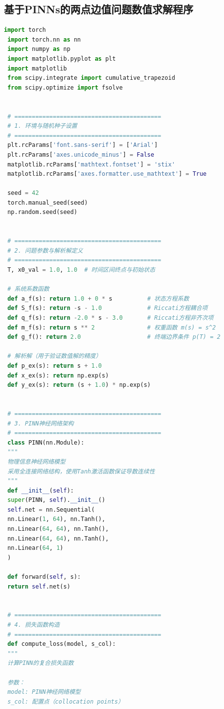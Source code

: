 \documentclass{GZUbachelorthesis}
\begin{document}
 \subsection*{基于PINNs的两点边值问题数值求解程序}
 \begin{lstlisting}[language=python]
 import torch
 import torch.nn as nn
 import numpy as np
 import matplotlib.pyplot as plt
 import matplotlib
 from scipy.integrate import cumulative_trapezoid
 from scipy.optimize import fsolve
 
 
 # ==========================================
 # 1. 环境与随机种子设置
 # ==========================================
 plt.rcParams['font.sans-serif'] = ['Arial']
 plt.rcParams['axes.unicode_minus'] = False
 matplotlib.rcParams['mathtext.fontset'] = 'stix'
 matplotlib.rcParams['axes.formatter.use_mathtext'] = True
 
 seed = 42
 torch.manual_seed(seed)
 np.random.seed(seed)
 
 
 # ==========================================
 # 2. 问题参数与解析解定义
 # ==========================================
 T, x0_val = 1.0, 1.0  # 时间区间终点与初始状态
 
 # 系统系数函数
 def a_f(s): return 1.0 + 0 * s          # 状态方程系数
 def S_f(s): return -s - 1.0             # Riccati方程耦合项
 def q_f(s): return -2.0 * s - 3.0       # Riccati方程非齐次项
 def m_f(s): return s ** 2               # 权重函数 m(s) = s^2
 def g_f(): return 2.0                   # 终端边界条件 p(T) = 2
 
 # 解析解（用于验证数值解的精度）
 def p_ex(s): return s + 1.0
 def x_ex(s): return np.exp(s)
 def y_ex(s): return (s + 1.0) * np.exp(s)
 
 
 # ==========================================
 # 3. PINN神经网络架构
 # ==========================================
 class PINN(nn.Module):
 """
 物理信息神经网络模型
 采用全连接网络结构，使用Tanh激活函数保证导数连续性
 """
 def __init__(self):
 super(PINN, self).__init__()
 self.net = nn.Sequential(
 nn.Linear(1, 64), nn.Tanh(),
 nn.Linear(64, 64), nn.Tanh(),
 nn.Linear(64, 64), nn.Tanh(),
 nn.Linear(64, 1)
 )
 
 def forward(self, s):
 return self.net(s)
 
 
 # ==========================================
 # 4. 损失函数构造
 # ==========================================
 def compute_loss(model, s_col):
 """
 计算PINN的复合损失函数
 
 参数：
 model: PINN神经网络模型
 s_col: 配置点（collocation points）
 

\end{lstlisting}
\end{document}
